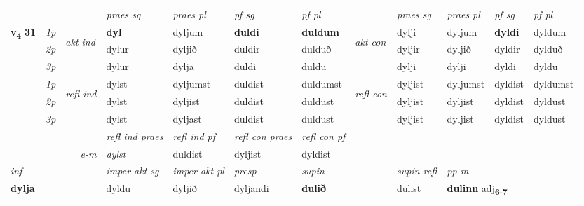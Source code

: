 \begin{longtable}[l]{X>{\footnotesize\itshape}llXXXXlXXXX}
 & &   & \textit{praes sg}  & \textit{praes pl}    & \textit{ pf sg} & \textit{pf pl} & & \textit{praes sg}  & \textit{praes pl}    & \textit{pf sg} & \textit{pf pl }  \\ \cmidrule{4-7} \cmidrule{9-12}
 \multirow{2}{*}{{{\textbf{v{\textsubscript{4}}} \Large{\textbf{31}}}}}  & 1p & \multirow{3}{*}{\begin{turn}{90}\textit{akt ind}\end{turn}} & \textbf{dyl} & dyljum & \textbf{duldi} & \textbf{duldum} & \multirow{3}{*}{\begin{turn}{90}\textit{akt con}\end{turn}} &dylji & dyljum & \textbf{dyldi} & dyldum\\*
 & 2p &  &  dylur  & dyljið & duldir & dulduð & & dyljir & dyljið & dyldir & dylduð \\*
 & 3p &  & dylur & dylja & duldi & duldu & & dylji & dylji& dyldi & dyldu \\*
\cmidrule{4-7} \cmidrule{9-12}
 & 1p & \multirow{3}{*}{\begin{turn}{90}\textit{refl ind}\end{turn}}  & dylst & dyljumst & duldist & duldumst & \multirow{3}{*}{\begin{turn}{90}\textit{refl con}\end{turn}}  &dyljist & dyljumst & dyldist & dyldumst \\*
 & 2p &  & dylst & dyljist & duldist & duldust & &dyljist & dyljist & dyldist & dyldust \\*
 & 3p  & & dylst & dyljast & duldist & duldust & & dyljist & dyljist& dyldist & dyldust \\*
\cmidrule{4-7} \cmidrule{9-12}

 & && \textit{refl ind praes} & \textit{refl ind pf} & \textit{refl con praes} & \textit{refl con pf} \\*
\multicolumn{3}{r}{\textit{e-m}}& dylst & duldist & dyljist & dyldist \\*

\cmidrule{4-7}
   {\textit{inf}} & &  & \textit{imper akt sg} & \textit{imper akt pl}   & \textit{presp} & \textit{supin} && \textit{supin refl} & \textit{pp m} \\*
  {\textbf{dylja}} & && dyldu  & dyljið   & dyljandi &  \textbf{dulið} && dulist & \multicolumn{2}{l}{\textbf{dulinn} adj\textbf{\textsubscript{6-7}}} \\*

\midrule


\end{longtable}
